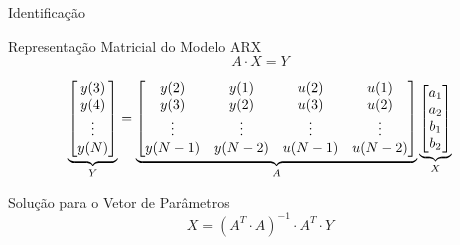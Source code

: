 \documentclass[aspectratio=169]{beamer}
\begin{document}
\begin{frame}{Identificação}
  
    \begin{block}{Representação Matricial do Modelo ARX}
        \begin{equation*}
            A \cdot X = Y
        \end{equation*}

        \begin{equation*}
            \underbrace{%
                \begin{bmatrix}
                    y(3) \\
                    y(4) \\
                    \vdots \\
                    y(N)
                \end{bmatrix}%
            }_{Y}
            =
            \underbrace{%
                \begin{bmatrix}
                    y(2) & y(1) & u(2) & u(1) \\
                    y(3) & y(2) & u(3) & u(2) \\
                    \vdots & \vdots & \vdots & \vdots \\
                    y(N-1) & y(N-2) & u(N-1) & u(N-2)
                \end{bmatrix}%
            }_{A}
            \underbrace{%
                \begin{bmatrix}
                    a_1 \\
                    a_2 \\
                    b_1 \\
                    b_2
                \end{bmatrix}%
            }_{X}
        \end{equation*}
    \end{block}

    \begin{block}{Solução para o Vetor de Parâmetros}
        \begin{equation*}
            X = (A^T \cdot A)^{-1} \cdot A^T \cdot Y
        \end{equation*}
    \end{block}

\end{frame}
\end{document}
